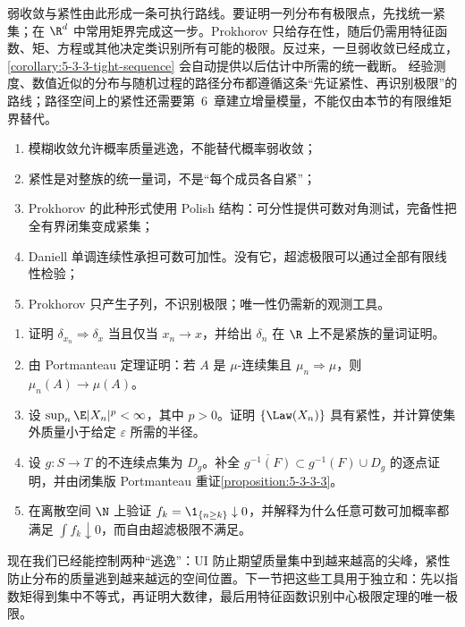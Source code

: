 弱收敛与紧性由此形成一条可执行路线。要证明一列分布有极限点，先找统一紧集；在
$\R^d$ 中常用矩界完成这一步。Prokhorov 只给存在性，随后仍需用特征函数、矩、方程或其他决定类识别所有可能的极限。反过来，一旦弱收敛已经成立，
\cref{corollary:5-3-3-tight-sequence} 会自动提供以后估计中所需的统一截断。
经验测度、数值近似的分布与随机过程的路径分布都遵循这条“先证紧性、再识别极限”的路线；路径空间上的紧性还需要第~6~章建立增量模量，不能仅由本节的有限维矩界替代。

\begin{remark}[边界条件不能省略]\label{rem:5-3-3-boundaries}
\begin{enumerate}
  \item 模糊收敛允许概率质量逃逸，不能替代概率弱收敛；
  \item 紧性是对整族的统一量词，不是“每个成员各自紧”；
  \item Prokhorov 的此种形式使用 Polish 结构：可分性提供可数对角测试，完备性把全有界闭集变成紧集；
  \item Daniell 单调连续性承担可数可加性。没有它，超滤极限可以通过全部有限线性检验；
  \item Prokhorov 只产生子列，不识别极限；唯一性仍需新的观测工具。
\end{enumerate}
\end{remark}

\begin{exercise}\label{exercise:5-3-3-1}
\begin{enumerate}
  \item 证明 $\delta_{x_n}\Rightarrow\delta_x$ 当且仅当 $x_n\to x$，并给出
  $\delta_n$ 在 $\R$ 上不是紧族的量词证明。
  \item 由 Portmanteau 定理证明：若 $A$ 是 $\mu$-连续集且
  $\mu_n\Rightarrow\mu$，则 $\mu_n(A)\to\mu(A)$。
  \item 设 $\sup_n\E|X_n|^p<\infty$，其中 $p>0$。证明
  $\{\Law(X_n)\}$ 具有紧性，并计算使集外质量小于给定 $\varepsilon$ 所需的半径。
  \item 设 $g:S\to T$ 的不连续点集为 $D_g$。补全
  $\overline{g^{-1}(F)}\subset g^{-1}(F)\cup D_g$ 的逐点证明，并由闭集版
  Portmanteau 重证\cref{proposition:5-3-3-3}。
  \item 在离散空间 $\N$ 上验证
  $f_k=\1_{\{n\ge k\}}\downarrow0$，并解释为什么任意可数可加概率都满足
  $\int f_k\downarrow0$，而自由超滤极限不满足。
\end{enumerate}
\end{exercise}

现在我们已经能控制两种“逃逸”：UI 防止期望质量集中到越来越高的尖峰，紧性防止分布的质量逃到越来越远的空间位置。下一节把这些工具用于独立和：先以指数矩得到集中不等式，再证明大数律，最后用特征函数识别中心极限定理的唯一极限。
